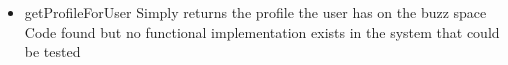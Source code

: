 \begin {itemize}
\begin {itemize}
\begin{figure}[h!]
  \centering
    \texttt{[image: buzzSpaceRegisterCode]} 
\end{figure}

\begin{figure}[h!]
  \centering
    \texttt{[image: addAdmin]} 
\end{figure}

\item{getProfileForUser}
Simply returns the profile the user has on the buzz space\\
Code found but no functional implementation exists in the system that could be tested \\
\end{itemize}

\end{itemize}
